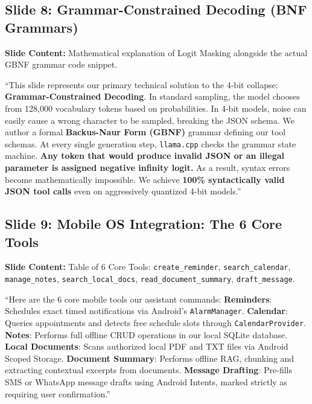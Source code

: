 \documentclass[11pt,a4paper]{article}
\begin{document}
\subsection{Slide 8: Grammar-Constrained Decoding (BNF Grammars)}
\textbf{Slide Content:} Mathematical explanation of Logit Masking alongside the actual GBNF grammar code snippet.

\begin{scriptbox}
``This slide represents our primary technical solution to the 4-bit collapse: \textbf{Grammar-Constrained Decoding}.
In standard sampling, the model chooses from 128,000 vocabulary tokens based on probabilities. In 4-bit models, noise can easily cause a wrong character to be sampled, breaking the JSON schema.
We author a formal \textbf{Backus-Naur Form (GBNF)} grammar defining our tool schemas.
At every single generation step, \texttt{llama.cpp} checks the grammar state machine. \textbf{Any token that would produce invalid JSON or an illegal parameter is assigned negative infinity logit.}
As a result, syntax errors become mathematically impossible. We achieve \textbf{100\% syntactically valid JSON tool calls} even on aggressively quantized 4-bit models.''
\end{scriptbox}

\subsection{Slide 9: Mobile OS Integration: The 6 Core Tools}
\textbf{Slide Content:} Table of 6 Core Tools: \texttt{create\_reminder}, \texttt{search\_calendar}, \texttt{manage\_notes}, \texttt{search\_local\_docs}, \texttt{read\_document\_summary}, \texttt{draft\_message}.

\begin{scriptbox}
``Here are the 6 core mobile tools our assistant commands:
\textbf{Reminders}: Schedules exact timed notifications via Android's \texttt{AlarmManager}.
\textbf{Calendar}: Queries appointments and detects free schedule slots through \texttt{CalendarProvider}.
\textbf{Notes}: Performs full offline CRUD operations in our local SQLite database.
\textbf{Local Documents}: Scans authorized local PDF and TXT files via Android Scoped Storage.
\textbf{Document Summary}: Performs offline RAG, chunking and extracting contextual excerpts from documents.
\textbf{Message Drafting}: Pre-fills SMS or WhatsApp message drafts using Android Intents, marked strictly as requiring user confirmation.''
\end{scriptbox}
\end{document}
